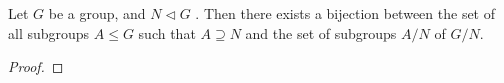 \documentclass[notoc,notitlepage,nobib]{tufte-book}
\begin{document}
\begin{thm}\label{thm:correspondence_theorem}
  Let $G$ be a group, and $N \triangleleft G$
  . Then there exists a bijection between
  the set of all subgroups $A \leq G$ such that $A \supseteq N$
  and the set of subgroups $A / N$ of $G / N$.
\end{thm}

\begin{proof}
\end{proof}



\backmatter

\pagestyle{plain}

% 

\printindex
\end{document}
